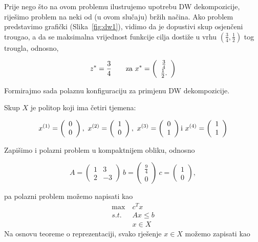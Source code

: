 \documentclass[a4paper, utf8, 11pt, colorlinks]{book}
\begin{document}
 Prije nego što na ovom problemu ilustrujemo upotrebu DW dekompozicije, riješimo problem na neki od (u ovom slučaju) bržih načina. Ako problem predstavimo grafički (Slika~\ref{fig:dw1}), vidimo da je dopustivi skup osjenčeni trougao, a da se maksimalna vrijednost funkcije cilja dostiže u vrhu $(\frac34, 
 \frac12)$ tog trougla, odnosno,

    \begin{equation}
 z^* = \frac 34\qquad \textnormal{za}\ x^*=\left(\begin{array}{c}
 	\frac34\\
 	\frac12.
 \end{array}\right)
 \end{equation}
 
 Formirajmo sada polaznu konfiguraciju za primjenu DW dekompozicije.
 
 Skup $X$ je politop koji ima četiri tjemena:
 
 $$   
 x^{(1)}=\left(\begin{array}{c}
 		0\\
 		0
 	\end{array}\right),\  x^{(2)}=\left(\begin{array}{c}
 	1\\
 	0
 \end{array}\right),\  x^{(3)}=\left(\begin{array}{c}
 0\\
 1
\end{array}\right) \textnormal{i}\ x^{(4)}=\left(\begin{array}{c}
1\\
1
\end{array}\right)
$$
 
 Zapišimo i polazni problem u kompaktnijem obliku, odnosno
 
 $$
 A = \left(\begin{array}{cc}
 	1 & 3 \\
 	2 & -3
 \end{array}\right) \ b=\left(\begin{array}{c}
 \frac 9 4\\
 0
\end{array}\right)\ c=\left(\begin{array}{c}
1\\
0
\end{array}\right),
 $$
 
 pa polazni problem možemo napisati kao
    \begin{equation}
 	\begin{aligned}\label{primjer:dw2}
 		\max\  &c^Tx\\
 		s.t.\  &Ax\leqslant b\\
 		&x \in X
 	\end{aligned}
 \end{equation}
Na osnovu teoreme o reprezentaciji, svako rješenje $x \in X$ možemo zapisati kao
\end{document}
